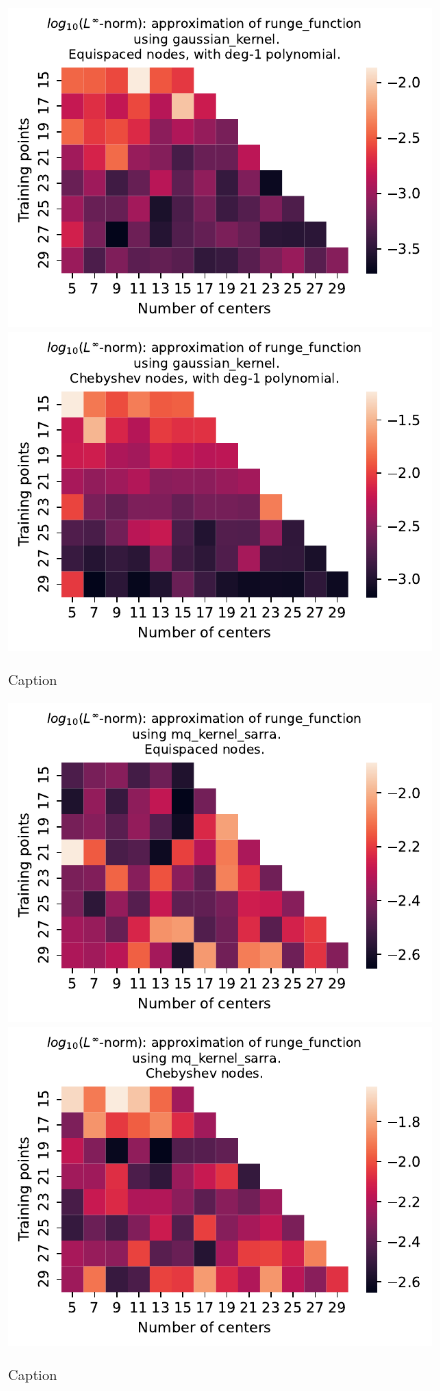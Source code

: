 \documentclass[12pt]{report} %
\begin{document}
\begin{figure}[ht]
  \centering

  \includegraphics[width=.49\textwidth]{imagenes/experiments/1d/variational/runge_function-Kgaussian_kernel-Poly-Equi.pdf}
  \includegraphics[width=.49\textwidth]{imagenes/experiments/1d/variational/runge_function-Kgaussian_kernel-Poly-Cheb.pdf}
  \caption{Caption}
  \label{fig:runge-gaussian-poly}
\end{figure}

\begin{figure}[ht]
  \centering

  \includegraphics[width=.49\textwidth]{imagenes/experiments/1d/variational/runge_function-Kmq_kernel_sarra-Equi.pdf}
  \includegraphics[width=.49\textwidth]{imagenes/experiments/1d/variational/runge_function-Kmq_kernel_sarra-Cheb.pdf}
  \caption{Caption}
  \label{fig:runge-sarra}
\end{figure}
\end{document}
